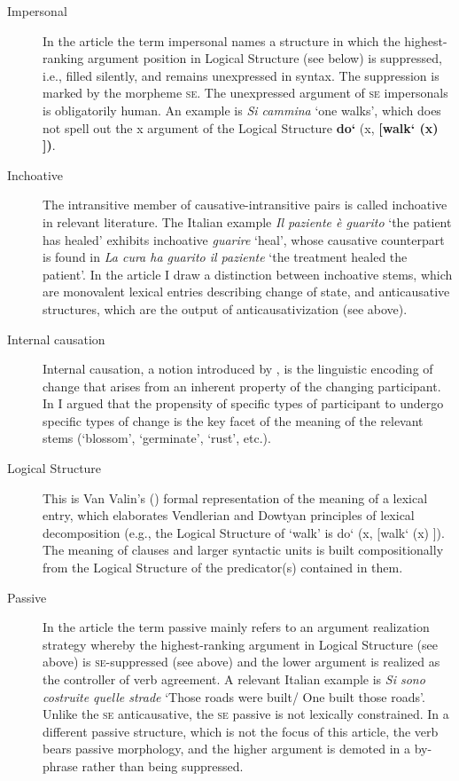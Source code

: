 \documentclass[output=paper,colorlinks,citecolor=brown
]{langscibook}
\begin{document}
\begin{description}
\item[Impersonal] In the article the term impersonal   names a structure in which the highest-ranking argument position in Logical   Structure (see below) is suppressed, i.e., filled silently, and remains   unexpressed in syntax. The suppression is marked by the morpheme \textsc{se}. The unexpressed argument of \textsc{se} impersonals is obligatorily human.  An example is \textit{Si cammina} ‘one   walks’, which does not spell out the x argument of the Logical Structure \textbf{do`} (x, \textbf{[walk` (x) ])}.
\item[Inchoative] The intransitive member of   causative-intransitive pairs is called inchoative in relevant   literature. The Italian example \textit{Il paziente è guarito} ‘the patient has   healed’ exhibits inchoative \textit{guarire} ‘heal’, whose causative   counterpart is found in \textit{La cura ha guarito il paziente} ‘the treatment   healed the patient’. In the article I draw a distinction between inchoative stems,   which are monovalent lexical entries describing change of state, and anticausative   structures, which are the output of anticausativization (see above).
\item[Internal   causation] Internal causation, a notion introduced   by \citet{levin1995unaccusativity}, is the linguistic encoding of change   that arises from an inherent property of the changing participant. In \citet{bentley2023internally} I argued that the propensity of specific types of participant to   undergo specific types of change is the key facet of the meaning of the   relevant stems (‘blossom’, ‘germinate’, ‘rust’, etc.).
\item[Logical   Structure] This is Van Valin's (\citeyear{vanvalin2005exploring,vanvalin2023principles}) formal   representation of the meaning of a lexical entry, which elaborates Vendlerian   and Dowtyan principles of lexical decomposition (e.g., the Logical Structure   of ‘walk’ is do` (x, [walk` (x) ]). The meaning of clauses   and larger syntactic units is built compositionally from the Logical   Structure of the predicator(s) contained in them.
\item[Passive] In the article the term passive   mainly refers to an argument realization strategy whereby the highest-ranking   argument in Logical Structure (see above) is \textsc{se}-suppressed   (see above) and the lower argument is realized as the controller of verb   agreement. A relevant Italian example is \textit{Si sono costruite quelle strade}   ‘Those roads were built/ One built those roads’. Unlike the \textsc{se} anticausative, the \textsc{se} passive is not lexically   constrained. In a different passive structure, which is not the focus of this   article, the verb bears passive morphology, and the higher argument is   demoted in a by-phrase rather than being suppressed.

\end{description}
\end{document}
